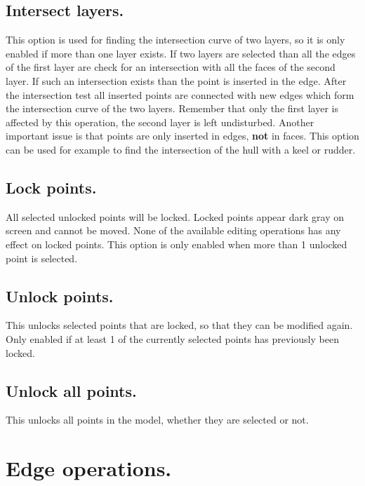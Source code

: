 \documentclass[12pt]{article}
\begin{document}
\subsection{Intersect layers.}
This option is used for finding the intersection curve of two layers,
so it is only enabled if more than one layer exists. If two layers are
selected than all the edges of the first layer are check for an
intersection with all the faces of the second layer. If such an
intersection exists than the point is inserted in the edge. After the
intersection test all inserted points are connected with new edges
which form the intersection curve of the two layers. Remember that
only the first layer is affected by this operation, the second layer
is left undisturbed. Another important issue is that points are only
inserted in edges, \textbf{not} in faces. This option can be used for example
to find the intersection of the hull with a keel or rudder.

\subsection{Lock points.}
All selected unlocked points will be locked. Locked points appear dark
gray on screen and cannot be moved. None of the available editing
operations has any effect on locked points. This option is only
enabled when more than 1 unlocked point is selected.

\subsection{Unlock points.}
This unlocks selected points that are locked, so that they can be
modified again. Only enabled if at least 1 of the currently selected
points has previously been locked.

\subsection{Unlock all points.}
This unlocks all points in the model, whether they are selected or not.

\pagebreak

\section{Edge operations.}
\end{document}
